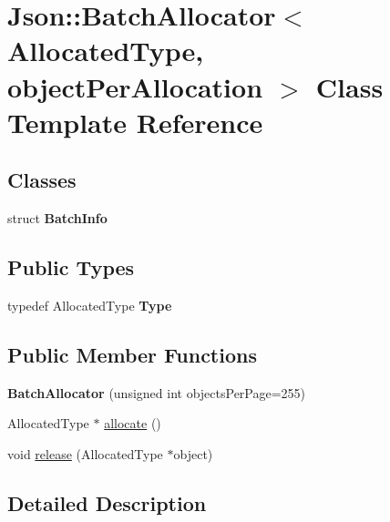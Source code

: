 \hypertarget{class_json_1_1_batch_allocator}{\section{Json\-:\-:Batch\-Allocator$<$ Allocated\-Type, object\-Per\-Allocation $>$ Class Template Reference}
\label{class_json_1_1_batch_allocator}
}
\subsection*{Classes}
\begin{DoxyCompactItemize}
\item 
struct {\bfseries Batch\-Info}
\end{DoxyCompactItemize}
\subsection*{Public Types}
\begin{DoxyCompactItemize}
\item 
\hypertarget{class_json_1_1_batch_allocator_a031e753885fcb007c20511e15f84d1a4}{typedef Allocated\-Type {\bfseries Type}}\label{class_json_1_1_batch_allocator_a031e753885fcb007c20511e15f84d1a4}

\end{DoxyCompactItemize}
\subsection*{Public Member Functions}
\begin{DoxyCompactItemize}
\item 
\hypertarget{class_json_1_1_batch_allocator_a96aae4d9032847b074e72a0cf32bc9ea}{{\bfseries Batch\-Allocator} (unsigned int objects\-Per\-Page=255)}\label{class_json_1_1_batch_allocator_a96aae4d9032847b074e72a0cf32bc9ea}

\item 
Allocated\-Type $\ast$ \hyperlink{class_json_1_1_batch_allocator_a4909756c2d33bd0f07662e88e4f850dd}{allocate} ()
\item 
void \hyperlink{class_json_1_1_batch_allocator_aceb116aceb6bb5bbcfd05433abc04ba5}{release} (Allocated\-Type $\ast$object)
\end{DoxyCompactItemize}


\subsection{Detailed Description}

